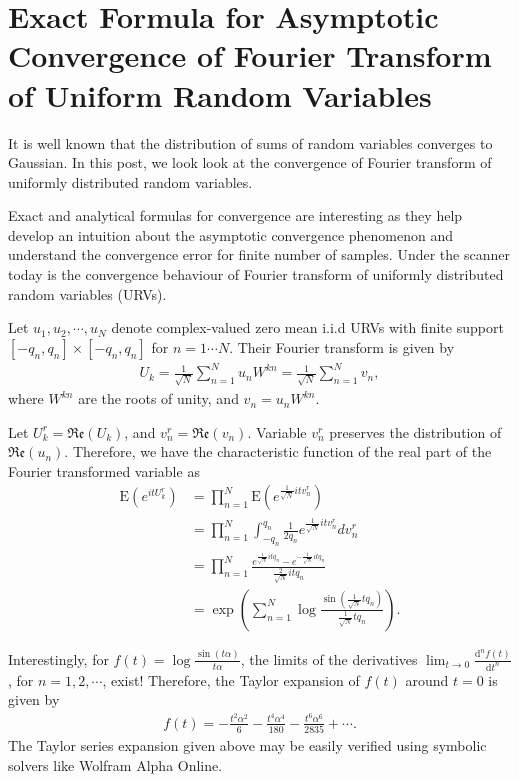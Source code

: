 \section{Exact Formula for Asymptotic Convergence of Fourier Transform of Uniform Random Variables}

It is well known that the distribution of sums of random variables converges to Gaussian. In this post, we look look at the convergence of Fourier transform of uniformly distributed random variables.

Exact and analytical formulas for convergence are interesting as they help develop an intuition about the asymptotic convergence phenomenon and understand the convergence error for finite number  of samples. Under the scanner today is the convergence behaviour of Fourier transform of uniformly distributed random variables (URVs). 

Let $u_1, u_2, \cdots, u_N$ denote complex-valued zero mean i.i.d URVs with finite support $[-q_n, q_n]\times [-q_n, q_n]$ for $n = 1\cdots N$. Their Fourier transform is given by
\begin{align}U_k = \frac{1}{\sqrt{N}} \sum_{n = 1}^{N} u_n W^{kn} = \frac{1}{\sqrt{N}} \sum_{n = 1}^{N} v_n,\end{align}
where $W^{kn}$ are the roots of unity, and $v_n = u_n W^{kn}$.

Let $U^r_k = \mathfrak{Re}(U_k)$, and $v^r_n = \mathfrak{Re}(v_n)$. Variable $v^r_n$ preserves the distribution of $\mathfrak{Re}(u_n)$. Therefore, we have the characteristic function of the real part of the Fourier transformed variable as
\begin{align}\text{E}(e^{itU_k^r}) &= \prod_{n = 1}^{N} \text{E}(e^{\frac{1}{\sqrt{N}}it v^r_n})\nonumber \\ &= \prod_{n = 1}^{N} \int_{-q_n}^{q_n} \frac{1}{2q_n} e^{\frac{1}{\sqrt{N}}it v^r_n} dv^r_n \nonumber\\ &= \prod_{n = 1}^{N} \frac{e^{\frac{1}{\sqrt{N}}itq_n} - e^{-\frac{1}{\sqrt{N}}itq_n}}{\frac{2}{\sqrt{N}}itq_n} \nonumber\\ &= \exp\left( \sum_{n = 1}^{N} \log \frac{\sin\left(\frac{1}{\sqrt{N}}tq_n\right)}{\frac{1}{\sqrt{N}}tq_n}\right).\end{align}

Interestingly, for $f(t) = \log \frac{\sin(t\alpha)}{t\alpha}$, the limits of the derivatives $\lim_{t\to 0} \frac{\text{d}^n f(t)}{\text{d}t^n}$, for $n = 1, 2, \cdots$, exist! Therefore, the Taylor expansion of $f(t)$ around $t=0$ is given by
\begin{align}f(t) = -\frac{t^2\alpha^2}{6} - \frac{t^4\alpha^4}{180} - \frac{t^6\alpha^6}{2835} + \cdots.\end{align}
The Taylor series expansion given above may be easily verified using symbolic solvers like Wolfram Alpha Online.

